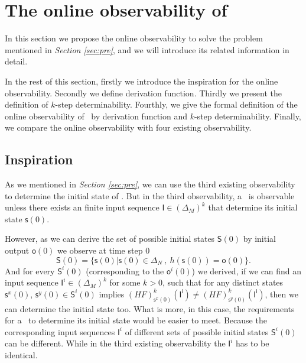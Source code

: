 \section{The online observability of \BCNs}
\label{sec:online}


In this section we propose the online observability to solve the problem mentioned in {\em Section \ref{sec:pre}}, and we will introduce its related information in detail. 

In the rest of this section, firstly we introduce the inspiration for the online observability. Secondly we define derivation function. Thirdly we present the definition of $k$-step determinability. Fourthly, we give the formal definition of the online observability of \BCNs\ by derivation function and $k$-step determinability. Finally, we compare the online observability with four existing observability.


\subsection{Inspiration}


As we mentioned in {\em Section \ref{sec:pre}}, we can use the third existing observability to determine the initial state of \BCN. But in the third observability, a \BCN\ is observable unless there exists an finite input sequence $\mathsf{I}\in(\Delta_M)^k$ that determine its initial state $\mathsf{s}(0)$. 

However, as we can derive the set of possible initial states $\mathsf{S}(0)$ by initial output $\mathsf{o}(0)$ we observe at time step $0$ 
\[\mathsf{S}(0)=\{\mathsf{s}(0)|\mathsf{s}(0)\in \Delta_N\ ,\ h( \mathsf{s}(0))=\mathsf{o}(0)\}.\]
And for every $\mathsf{S}^{i}(0)$ (corresponding to the $\mathsf{o}^{i}(0)$) we derived, if we can find an input sequence $\mathsf{I}^{i}\in(\Delta_M)^k$ for some $k>0$, such that for any distinct states $\mathsf{s}^{x}(0)$, $\mathsf{s}^{y}(0) \in \mathsf{S}^{i}(0)$ implies $(HF)^k_{\mathsf{s}^{x}(0)}(\mathsf{I^i})\neq (HF)^k_{\mathsf{s}^{y}(0)}(\mathsf{I^i})$,
then we can determine the initial state too. 
What is more, in this case, the requirements for a \BCN\ to determine its initial state would be easier to meet. Because the corresponding input sequences $\mathsf{I}^{i}$ of different sets of possible initial states $\mathsf{S}^{i}(0)$ can be different. While in the third existing observability the $\mathsf{I}^{i}$ has to be identical.

